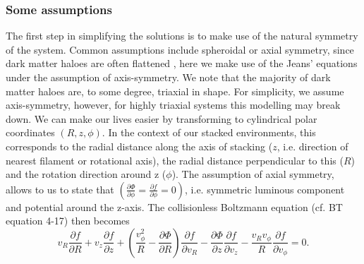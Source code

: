 \subsubsection{Some assumptions}
The first step in simplifying the solutions is to make use of the natural symmetry of the system. Common assumptions include spheroidal or axial symmetry, since dark matter haloes are often flattened \citep[e.g. in Illustris;][]{chua2019}, here we make use of the Jeans' equations under the assumption of axis-symmetry. We note that the majority of dark matter haloes are, to some degree, triaxial in shape. For simplicity, we assume axis-symmetry, however, for highly triaxial systems this modelling may break down. We can make our lives easier by transforming to cylindrical polar coordinates $(R,z,\phi)$. In the context of our stacked environments, this corresponds to the radial distance along the axis of stacking ($z$, i.e. direction of nearest filament or rotational axis), the radial distance perpendicular to this ($R$) and the rotation direction around z ($\phi$). The assumption of axial symmetry, allows to us to state that $(\frac{\partial \Phi}{\partial \phi} = \frac{\partial f}{\partial \phi} = 0)$, i.e. symmetric luminous component and potential around the z-axis. The collisionless Boltzmann equation (cf. BT equation 4-17) then becomes
\begin{equation}
v_{R}\frac{\partial f}{\partial R} + v_{z}\frac{\partial f}{\partial z} + \left(\frac{v_{\phi}^2}{R} - \frac{\partial \Phi}{\partial R}\right)\frac{\partial f}{\partial v_{R}} -\frac{\partial \Phi}{\partial z}\frac{\partial f}{\partial v_z} - \frac{v_R v_{\phi}}{R}\frac{\partial f}{\partial v_{\phi}} = 0.
\end{equation}

